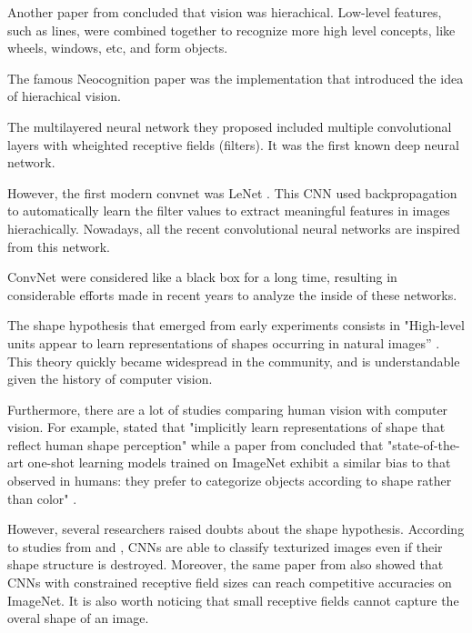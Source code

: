 \documentclass{article}
\begin{document}
\noindent 
Another paper from \cite{marr1982vision} concluded that vision was hierachical. Low-level features, such as lines,
were combined together to recognize more high level concepts, 
like wheels, windows, etc, and form objects. \medskip \par 

\noindent
The famous Neocognition paper \cite{neocognitron} was 
the implementation that introduced the idea of hierachical vision. 

\noindent
The multilayered neural network they proposed 
included multiple convolutional layers with wheighted receptive fields (filters).
It was the first known deep neural network. \medskip \par

\noindent
However, the first modern convnet was LeNet \cite{Lecun98gradient-basedlearning}.
This CNN used backpropagation to automatically learn the filter values to extract meaningful 
features in images hierachically.
Nowadays, all the recent convolutional neural networks are inspired from this network. \medskip \par

\noindent
ConvNet were considered like a black box for a long time, 
resulting in considerable efforts made in
recent years to analyze the inside of these networks. \medskip \par

\noindent
The shape hypothesis that emerged from early experiments consists in
"High-level units appear to learn representations of shapes occurring in natural images” 
\cite{Kriegeskorte029876}. This theory quickly became widespread in the community, and
is understandable given the history of computer vision. \medskip \par

\noindent
Furthermore, there are a lot of studies comparing human vision with computer vision. For example,
\cite{kubiliusshape} stated that 
"implicitly learn representations of shape that reflect human shape perception"
while a paper from \cite{ritter2017cognitive} concluded that 
"state-of-the-art one-shot learning models trained on ImageNet exhibit  
a similar bias to that observed in humans: they prefer to categorize objects according  
to shape rather than color" . \medskip \par

\noindent
However, several researchers raised doubts about the shape hypothesis.
According to studies from \cite{gatys2017textures} and \cite{brendel2019approximating}, 
CNNs are able to classify texturized images even if their shape structure is destroyed.
Moreover, the same paper from \cite{brendel2019approximating} also
showed that CNNs with constrained receptive field sizes can reach competitive accuracies on ImageNet.
It is also worth noticing that small receptive fields 
cannot capture the overal shape of an image. \medskip \par
\end{document}
